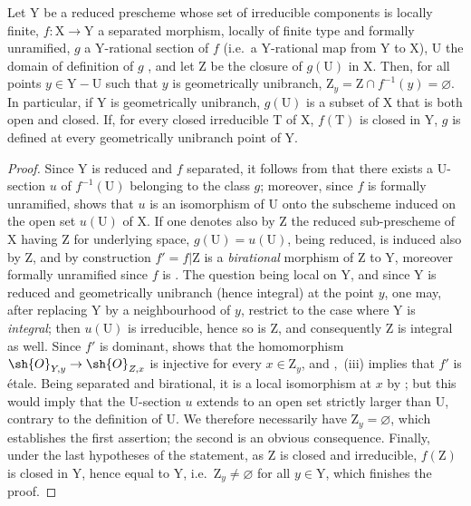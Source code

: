 \begin{proposition}[18.10.19]
\label{IV.18.10.19}
Let $\mathrm{Y}$ be a reduced prescheme whose set of irreducible components is locally finite, $f:\mathrm{X}\to\mathrm{Y}$ a separated morphism, locally of finite type and formally unramified, $g$ a $\mathrm{Y}$-rational section of $f$ (i.e.\ a $\mathrm{Y}$-rational map from $\mathrm{Y}$ to $\mathrm{X}$), $\mathrm{U}$ the domain of definition of $g$ , and let $\mathrm{Z}$ be the closure of $g(\mathrm{U})$ in $\mathrm{X}$.
Then, for all points $y\in\mathrm{Y}-\mathrm{U}$ such that $y$ is geometrically unibranch, $\mathrm{Z}_y=\mathrm{Z}\cap f^{-1}(y)=\varnothing$.
In particular, if $\mathrm{Y}$ is geometrically unibranch, $g(\mathrm{U})$ is a subset of $\mathrm{X}$ that is both open and closed.
If, for every closed irreducible $\mathrm{T}$ of $\mathrm{X}$, $f(\mathrm{T})$ is closed in $\mathrm{Y}$, $g$ is defined at every geometrically unibranch point of $\mathrm{Y}$.
\end{proposition}

\begin{proof}
Since $\mathrm{Y}$ is reduced and $f$ separated, it follows from  that there exists a $\mathrm{U}$-section $u$ of $f^{-1}(\mathrm{U})$ belonging to the class $g$; moreover, since $f$ is formally unramified,  shows that $u$ is an isomorphism of $\mathrm{U}$ onto the subscheme induced on the open set $u(\mathrm{U})$ of $\mathrm{X}$.
If one denotes also by $\mathrm{Z}$ the reduced sub-prescheme of $\mathrm{X}$ having $\mathrm{Z}$ for underlying space, $g(\mathrm{U})=u(\mathrm{U})$, being reduced, is induced also by $\mathrm{Z}$, and by construction $f'=f|\mathrm{Z}$ is a \emph{birational} morphism of $\mathrm{Z}$ to $\mathrm{Y}$, moreover formally unramified since $f$ is .
The question being local on $\mathrm{Y}$, and since $\mathrm{Y}$ is reduced and geometrically unibranch (hence integral) at the point $y$, one may, after replacing $\mathrm{Y}$ by a neighbourhood of $y$, restrict to the case where $\mathrm{Y}$ is \emph{integral}; then $u(\mathrm{U})$ is irreducible, hence so is $\mathrm{Z}$, and consequently $\mathrm{Z}$ is integral as well.
Since $f'$ is dominant,  shows that the homomorphism $\sh{O}_{Y,y}\to\sh{O}_{Z,x}$ is injective for every $x\in\mathrm{Z}_y$, and ,~(iii) implies that $f'$ is \'etale. Being separated and birational, it is a local isomorphism at $x$ by ; but this would imply that the $\mathrm{U}$-section $u$ extends to an open set strictly larger than $\mathrm{U}$, contrary to the definition of $\mathrm{U}$.
We therefore necessarily have $\mathrm{Z}_y=\varnothing$, which establishes the first assertion; the second is an obvious consequence.
Finally, under the last hypotheses of the statement, as $\mathrm{Z}$ is closed and irreducible, $f(\mathrm{Z})$ is closed in $\mathrm{Y}$, hence equal to $\mathrm{Y}$, i.e.\ $\mathrm{Z}_y\neq\varnothing$ for all $y\in\mathrm{Y}$, which finishes the proof.
\end{proof}

